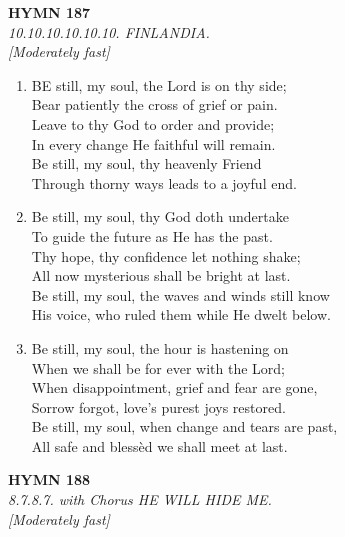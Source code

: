 \documentclass[11pt,a4paper]{article}
\begin{document}
\newpage
\begin{center}
    {\Large \textbf{HYMN 187}}
    \\
    \textit{10.10.10.10.10.10. FINLANDIA.}
    \\
    \textit{\small [Moderately fast]}
\end{center}
\vspace{1em}

\begin{enumerate}
    \item BE still, my soul, the Lord is on thy side; \\
        Bear patiently the cross of grief or pain. \\
        Leave to thy God to order and provide; \\
        In every change He faithful will remain. \\
        Be still, my soul, thy heavenly Friend \\
        Through thorny ways leads to a joyful end.

    \item Be still, my soul, thy God doth undertake \\
        To guide the future as He has the past. \\
        Thy hope, thy confidence let nothing shake; \\
        All now mysterious shall be bright at last. \\
        Be still, my soul, the waves and winds still know \\
        His voice, who ruled them while He dwelt below.

    \item Be still, my soul, the hour is hastening on \\
        When we shall be for ever with the Lord; \\
        When disappointment, grief and fear are gone, \\
        Sorrow forgot, love's purest joys restored. \\
        Be still, my soul, when change and tears are past, \\
        All safe and bless\`ed we shall meet at last.

\end{enumerate}

\newpage
\begin{center}
    {\Large \textbf{HYMN 188}}
    \\
    \textit{8.7.8.7. with Chorus HE WILL HIDE ME.}
    \\
    \textit{\small [Moderately fast]}
\end{center}
\vspace{1em}
\end{document}

